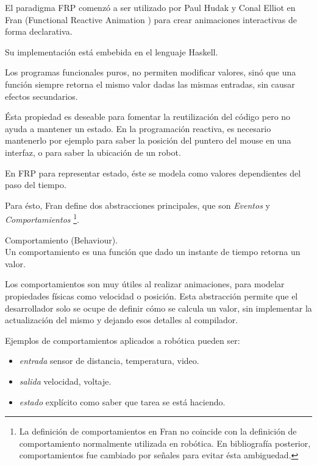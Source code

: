 

El paradigma FRP comenzó a ser utilizado por Paul Hudak y Conal Elliot en
Fran (Functional Reactive Animation \cite{ElliottHudak97:Fran})
para crear animaciones interactivas de forma declarativa.

Su implementación está embebida en el lenguaje Haskell.

Los programas funcionales puros, no permiten modificar valores,
sinó que una función siempre retorna el mismo valor dadas las mismas
entradas, sin causar efectos secundarios.

Ésta propiedad es deseable para fomentar la reutilización del código
pero no ayuda a mantener un estado.
En la programación reactiva, es necesario mantenerlo por
ejemplo para saber la posición del puntero del mouse en una interfaz,
o para saber la ubicación de un robot.

En FRP para representar estado, éste se modela como valores dependientes
del paso del tiempo.

Para ésto, Fran define dos abstracciones principales,
que son \emph{Eventos} y \emph{Comportamientos}
\footnote{La definición de comportamientos en Fran no coincide con
la definición de comportamiento normalmente utilizada en robótica.
En bibliografía posterior, comportamientos fue cambiado por señales
para evitar ésta ambiguedad.}.

\begin{definicion}
  Comportamiento (Behaviour).\\

  Un comportamiento es una función que dado un instante de tiempo
  retorna un valor.


\end{definicion}

  Los comportamientos son muy útiles al realizar animaciones,
para modelar propiedades físicas como velocidad o posición.
  Esta abstracción permite que el desarrollador solo se ocupe de
definir cómo se calcula un valor, sin implementar la actualización
del mismo y dejando esos detalles al compilador.

  Ejemplos de comportamientos aplicados a robótica pueden ser:

\begin{itemize}
  \item \textit{entrada} sensor de distancia, temperatura, video.
  \item \textit{salida} velocidad, voltaje.
  \item \textit{estado} explícito como saber que tarea se está haciendo.
\end{itemize}

